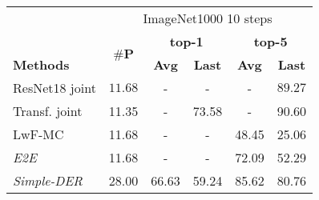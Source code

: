 \begin{table*}[t]
    \centering
    \begin{adjustbox}{max width=\textwidth}
        \begin{tabular}{l|ccccc}
            \toprule[0.3mm]
                                                                      & \multicolumn{5}{c}{ImageNet1000 10 steps}                                                                                                                               \\
                                                                      & \multirow{2}{*}{\textbf{$\#$P}}           & \multicolumn{2}{c}{\textbf{top-1}} & \multicolumn{2}{c}{\textbf{top-5}}                                                     \\
            \cmidrule{3-6}
            \textbf{Methods}                                          &                                           & \textbf{Avg}                       & \textbf{Last}                      & \textbf{Avg}            & \textbf{Last}           \\
            \hline
            ResNet18 joint                                            & $11.68$                                   & -                                  & -                                  & -                       & $89.27$                 \\
            Transf. joint                                             & 11.35                                     & -                                  & 73.58                              & -                       & 90.60                   \\
            \midrule
            LwF-MC \citep{rebuffi2017icarl}                           & 11.68                                     & -                                  & -                                  & 48.45                   & 25.06                   \\
            \textit{E2E} \citep{castro2018end_to_end_inc_learn}       & 11.68                                     & -                                  & -                                  & 72.09                   & 52.29                   \\
            \textit{Simple-DER} \citep{li2021preserve}                & 28.00                                     & 66.63                              & 59.24                              & 85.62                   & 80.76                   \\

\end{tabular}
\end{adjustbox}
\end{table*}
